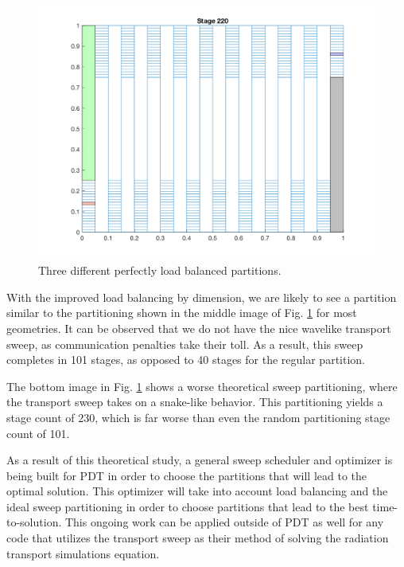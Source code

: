 \documentclass[letterpaper]{mandc2019}
\begin{document}
{\begin{figure}[!htb]
    \includegraphics[scale=0.4]{Figures/worst_partition_4.png}
  \caption{Three different perfectly load balanced partitions.}
  \label{partitions}
\end{figure}

With the improved load balancing by dimension, we are likely to see a partition similar to the partitioning shown in  the middle image of Fig. \ref{partitions} for most geometries. It can be observed that we do not have the nice wavelike transport sweep, as communication penalties take their toll. As a result, this sweep completes in 101 stages, as opposed to 40 stages for the regular partition.


The bottom image in Fig. \ref{partitions} shows a worse theoretical sweep partitioning, where the transport sweep takes on a snake-like behavior. This partitioning yields a stage count of 230, which is far worse than even the random partitioning stage count of 101.

As a result of this theoretical study, a general sweep scheduler and optimizer is being built for PDT in order to choose the partitions that will lead to the optimal solution. This optimizer will take into account load balancing and the ideal sweep partitioning in order to choose partitions that lead to the best time-to-solution. This ongoing work can be applied outside of PDT as well for any code that utilizes the transport sweep as their method of solving the radiation transport simulations equation.

}
\end{document}
